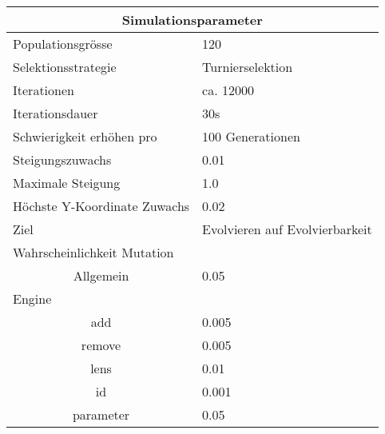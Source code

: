 
\begin{tabular}{ | l | l | }

  \hline
  \multicolumn{2}{|c|}{Simulationsparameter} \\
  \hline
  Populationsgrösse & 120 \\ \hline
  Selektionsstrategie & Turnierselektion \\ \hline
  Iterationen & ca. 12000 \\ \hline
  Iterationsdauer & 30s \\ \hline
  Schwierigkeit erhöhen pro & 100 Generationen \\ \hline
  Steigungszuwachs & 0.01 \\ \hline
  Maximale Steigung & 1.0 \\ \hline
  Höchste Y-Koordinate Zuwachs  & 0.02 \\ \hline
  Ziel & Evolvieren auf Evolvierbarkeit \\ \hline
  \multicolumn{2}{|l|}{Wahrscheinlichkeit Mutation}\\ \hline
  \multicolumn{1}{|c|}{Allgemein} & 0.05 \\ \hline
  Engine &  \\ \hline
  \multicolumn{1}{|c|}{add} & 0.005 \\ \hline
  \multicolumn{1}{|c|}{remove} & 0.005 \\ \hline
  \multicolumn{1}{|c|}{lens} & 0.01 \\ \hline
  \multicolumn{1}{|c|}{id} & 0.001 \\ \hline
  \multicolumn{1}{|c|}{parameter} & 0.05 \\ \hline

\end{tabular}
